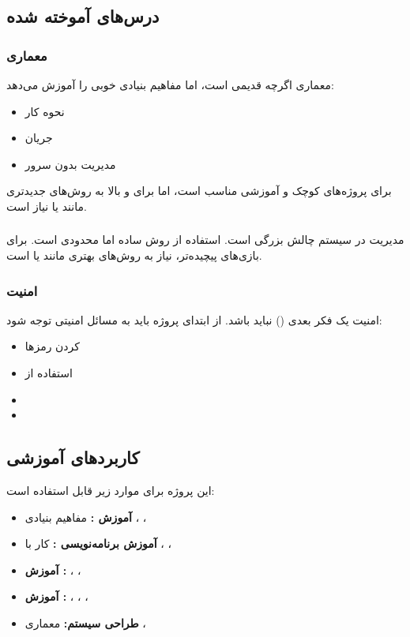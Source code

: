 \documentclass[12pt,a4paper]{article}
\begin{document}
	\subsection{درس‌های آموخته شده}
	
	\subsubsection{معماری }
	معماری  اگرچه قدیمی است، اما مفاهیم بنیادی خوبی را آموزش می‌دهد:
	\begin{itemize}
		\item نحوه کار 
		\item جریان 
		\item مدیریت  بدون سرور
	\end{itemize}
	برای پروژه‌های کوچک و آموزشی مناسب است، اما برای  و  بالا به روش‌های جدیدتری مانند  یا  نیاز است.
	
	\subsubsection{}
	مدیریت  در سیستم  چالش بزرگی است. استفاده از  روش ساده اما محدودی است.
	برای بازی‌های پیچیده‌تر، نیاز به روش‌های بهتری مانند  یا  است.
	
	\subsubsection{امنیت}
	امنیت یک فکر بعدی () نباید باشد.
	از ابتدای پروژه باید به مسائل امنیتی توجه شود:
	\begin{itemize}
		\item {} کردن رمزها
		\item استفاده از 
		\item {}
		\item {}
	\end{itemize}
	
	\subsection{کاربردهای آموزشی}
	این پروژه برای موارد زیر قابل استفاده است:
	
	\begin{itemize}
		\item \textbf{آموزش :} مفاهیم بنیادی ، ، 
		\item \textbf{آموزش برنامه‌نویسی :} کار با ، ، 
		\item \textbf{آموزش :} ، ، 
		\item \textbf{آموزش :} ، ، ، 
		\item \textbf{طراحی سیستم:} معماری ، 
	\end{itemize}
	
\end{document}
